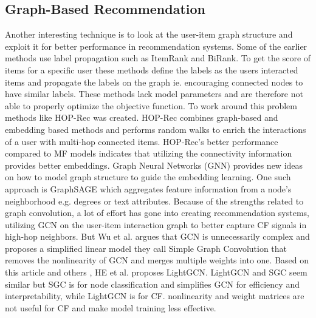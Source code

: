 \subsection{Graph-Based Recommendation}
Another interesting technique is to look at the user-item graph structure and exploit it for better performance in recommendation systems.
Some of the earlier methods use label propagation such as ItemRank\cite{ItemRank} and BiRank\cite{BiRank}.
To get the score of items for a specific user these methods define the labels as the users interacted items and propagate the labels on the graph ie. encouraging connected nodes to have similar labels.
These methods lack model parameters and are therefore not able to properly optimize the objective function\cite{NGCF_2019}.
To work around this problem methods like HOP-Rec \cite{HOP_Rec} was created.
HOP-Rec combines graph-based and embedding based methods and performs random walks to enrich the interactions of a user with multi-hop connected items.
HOP-Rec's better performance compared to MF models indicates that utilizing the connectivity information provides better embeddings.
Graph Neural Networks (GNN) provides new ideas on how to model graph structure to guide the embedding learning.
One such approach is GraphSAGE\cite{IND_REP_LEA} which aggregates feature information from a node's neighborhood e.g. degrees or text attributes.
Because of the strengths related to graph convolution, a lot of effort has gone into creating recommendation systems\cite{NGCF_2019,GC_MC,Priceaware}, utilizing GCN on the user-item interaction graph to better capture CF signals in high-hop neighbors.
But Wu et al. \cite{SGCN} argues that GCN is unnecessarily complex and proposes a simplified linear model they call Simple Graph Convolution that removes the nonlinearity of GCN and merges multiple weights into one.
Based on this article and others \cite{PRE_PROP,DEEP_GCN}, HE et al. \cite{lightgcn} proposes LightGCN.
LightGCN and SGC seem similar but SGC is for node classification and simplifies GCN for efficiency and interpretability, while LightGCN is for CF.
nonlinearity and weight matrices are not useful for CF and make model training less effective.

